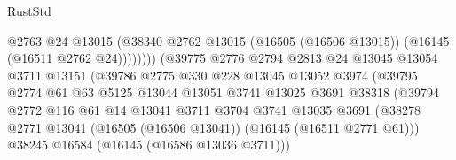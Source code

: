 \begin{lexlean}{RustStd}
\begin{coremodule}
                                            @2763
                                            @24
                                            @13015
                                            (@38340
                                              @2762
                                              @13015
                                              (@16505 (@16506 @13015))
                                              (@16145 (@16511 @2762 @24))))))))
                                  (@39775
                                    @2776
                                    @2794
                                    @2813
                                    @24
                                    @13045
                                    @13054
                                    @3711
                                    @13151
                                    (@39786
                                      @2775
                                      @330
                                      @228
                                      @13045
                                      @13052
                                      @3974
                                      (@39795
                                        @2774
                                        @61
                                        @63
                                        @5125
                                        @13044
                                        @13051
                                        @3741
                                        @13025
                                        @3691
                                        @38318
                                        (@39794
                                          @2772
                                          @116
                                          @61
                                          @14
                                          @13041
                                          @3711
                                          @3704
                                          @3741
                                          @13035
                                          @3691
                                          (@38278
                                            @2771
                                            @13041
                                            (@16505 (@16506 @13041))
                                            (@16145 (@16511 @2771 @61)))
                                          @38245
                                          @16584
                                          (@16145 (@16586 @13036 @3711)))

\end{coremodule}
\end{lexlean}
